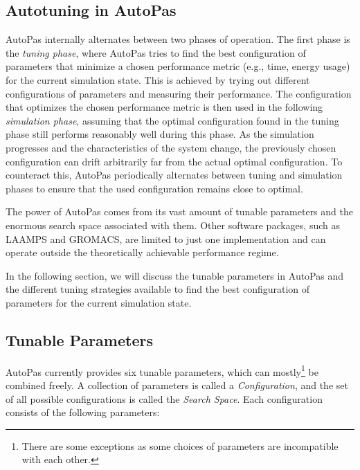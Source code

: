 \subsection{Autotuning in AutoPas}

AutoPas internally alternates between two phases of operation. The first phase is the \emph{tuning phase}, where AutoPas tries to find the best configuration of parameters that minimize a chosen performance metric (e.g., time, energy usage) for the current simulation state. This is achieved by trying out different configurations of parameters and measuring their performance. The configuration that optimizes the chosen performance metric is then used in the following \emph{simulation phase}, assuming that the optimal configuration found in the tuning phase still performs reasonably well during this phase.
As the simulation progresses and the characteristics of the system change, the previously chosen configuration can drift arbitrarily far from the actual optimal configuration. To counteract this, AutoPas periodically alternates between tuning and simulation phases to ensure that the used configuration remains close to optimal.

The power of AutoPas comes from its vast amount of tunable parameters and the enormous search space associated with them. Other software packages, such as LAAMPS and GROMACS, are limited to just one implementation and can operate outside the theoretically achievable performance regime.

In the following section, we will discuss the tunable parameters in AutoPas and the different tuning strategies available to find the best configuration of parameters for the current simulation state.

\subsection{Tunable Parameters}

AutoPas currently provides six tunable parameters, which can mostly\footnote{There are some exceptions as some choices of parameters are incompatible with each other.} be combined freely. A collection of parameters is called a \emph{Configuration}, and the set of all possible configurations is called the \emph{Search Space}. Each configuration consists of the following parameters:

